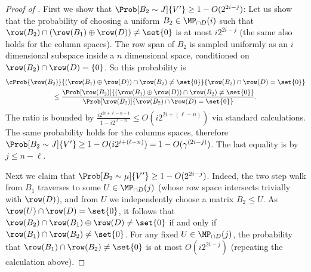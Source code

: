 \begin{proof}[Proof of ]
First we show that \(\Prob[B_2 \sim J]{V'} \geq 1-O(2^{2i-j})\): Let us show that the probability of choosing a uniform \(B_2 \in \MP_{\cap D}(i)\) such that \(\row(B_2) \cap (\row(B_1) \oplus \row(D)) \ne \set{0}\) is at most \(i2^{2i-j}\) (the same also holds for the column spaces). The row span of \(B_2\) is sampled uniformly as an \(i\) dimensional subspace inside a \(n\) dimensional space, conditioned on \(\row(B_2) \cap \row(D) = \{0\}\). So this probability is 
\begin{multline*}
    \cProb{\row(B_2)}{(\row(B_1) \oplus \row(D)) \cap \row(B_2) \ne \set{0}}{\row(B_2) \cap \row(D) = \set{0}}\\
    \leq \frac{\Prob[\row(B_2)]{(\row(B_1) \oplus \row(D)) \cap \row(B_2) \ne \set{0}}}{\Prob[\row(B_2)]{\row(B_2) \cap \row(D) = \set{0}}}.
\end{multline*}
The ratio is bounded by \(\frac{i2^{2i+\ell-n-1}}{1-i2^{\ell-n}} \leq O(i2^{2i +(\ell-n)})\) via standard calculations. The same probability holds for the columns spaces, therefore \(\Prob[B_2 \sim J]{V'} \geq 1-O(i2^{i +(\ell-n)}) = 1-O(\gamma^{(2i-j)})\). The last equality is by \(j \leq n-\ell\).

Next we claim that \(\Prob[B_2 \sim \mu]{V'} \geq 1-O(2^{2i-j})\). Indeed, the two step walk from \(B_1\) traverses to some \(U \in \MP_{\cap D}(j)\) (whose row space intersects trivially with \(\row(D)\)), and from \(U\) we independently choose a matrix \(B_2 \leq U\). As \(\row(U) \cap \row(D) = \set{0}\), it follows that \(\row(B_2) \cap \row(B_1) \oplus \row(D) \ne \set{0}\) if and only if \(\row(B_1) \cap \row(B_2) \ne \set{0}\). For any fixed \(U \in \MP_{\cap D}(j)\), the probability that \(\row(B_1) \cap \row(B_2) \ne \set{0}\) is at most \(O(i2^{2i-j})\) (repeating the calculation above).

\medskip


\end{proof}
